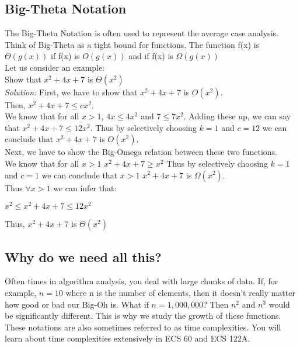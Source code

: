 \subsection{Big-Theta Notation}
The Big-Theta Notation is often used to represent the average case analysis.
Think of Big-Theta as a tight bound for functions. The function f(x) is
$\Theta(g(x))$ if f(x) is $O(g(x))$ and if f(x) is $\Omega(g(x))$ \\
Let us consider an example: \\
Show that $x^{2} + 4x + 7$ is $\Theta(x^{2})$ \\
\indent \emph{Solution:} First, we have to show that $x^{2} + 4x + 7$ is
$O(x^{2})$. \\
\indent \indent Then, $x^{2} + 4x + 7 \leq cx^{2}$. \\
\indent \indent We know that for all $x > 1$, $4x \leq 4x^{2}$ and $7 \leq
7x^{2}$. Adding these up, we can say that $x^{2} + 4x + 7 \leq 12x^{2}$. Thus
by selectively choosing $k = 1$ and $c = 12$ we can conclude that $x^{2} + 4x +
7$ is $O(x^{2})$.\\
\noindent Next, we have to show the Big-Omega relation between these two
functions. \\
\indent \indent We know that for all $x > 1$ $x^{2} + 4x + 7 \geq x^{2}$
\indent \indent Thus by selectively choosing $k = 1$ and $c = 1$ we can
conclude that $x > 1$ $x^{2} + 4x + 7$ is $\Omega(x^{2})$. \\
\indent \indent Thus $\forall x > 1$ we can infer that:
\begin{center}
    $x^{2} \leq x^{2} + 4x + 7 \leq 12x^{2}$
\end{center}
\indent \indent Thus, $x^{2} + 4x + 7$ is $\Theta(x^{2})$
\subsection{Why do we need all this?}
Often times in algorithm analysis, you deal with large chunks of data. If, for
example, $n = 10$ where n is the number of elements, then it doesn't really
matter how good or bad our Big-Oh is. What if $n = 1,000,000$? Then $n^{2}$ and
$n^{3}$ would be significantly different. This is why we study the growth of
these functions. These notations are also sometimes referred to as time
complexities. You will learn about time complexities extensively in ECS 60 and
ECS 122A.

